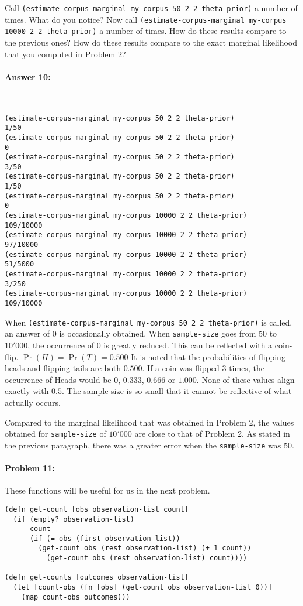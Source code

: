 \documentclass[12pt, letterpaper]{article}
\begin{document}
\noindent Call \texttt{(estimate-corpus-marginal my-corpus 50 2 2
  theta-prior)} a number of times. What do you notice? Now call
\texttt{(estimate-corpus-marginal my-corpus 10000 2 2 theta-prior)} a
number of times. How do these results compare to the previous ones?
How do these results compare to the exact marginal
likelihood that you computed in Problem 2?

\paragraph{Answer 10:}~\begin{lstlisting}
(estimate-corpus-marginal my-corpus 50 2 2 theta-prior)
1/50
(estimate-corpus-marginal my-corpus 50 2 2 theta-prior)
0
(estimate-corpus-marginal my-corpus 50 2 2 theta-prior)
3/50
(estimate-corpus-marginal my-corpus 50 2 2 theta-prior)
1/50
(estimate-corpus-marginal my-corpus 50 2 2 theta-prior)
0
(estimate-corpus-marginal my-corpus 10000 2 2 theta-prior)
109/10000
(estimate-corpus-marginal my-corpus 10000 2 2 theta-prior)
97/10000
(estimate-corpus-marginal my-corpus 10000 2 2 theta-prior)
51/5000
(estimate-corpus-marginal my-corpus 10000 2 2 theta-prior)
3/250
(estimate-corpus-marginal my-corpus 10000 2 2 theta-prior)
109/10000
\end{lstlisting} When \texttt{(estimate-corpus-marginal my-corpus 50 2 2 theta-prior)} is called, an answer of 0 is occasionally obtained. When \texttt{sample-size} goes from $50$ to $10'000$, the occurrence of $0$ is greatly reduced. This can be reflected with a coin-flip. $\Pr(H) = \Pr(T) = 0.500$ It is noted that the probabilities of flipping heads and flipping tails are both $0.500$. If a coin was flipped 3 times, the occurrence of Heads would be $0$, $0.333$, $0.666$ or $1.000$. None of these values align exactly with $0.5$. The sample size is so small that it cannot be reflective of what actually occurs.

Compared to the marginal likelihood that was obtained in Problem 2, the values obtained for \texttt{sample-size} of $10'000$ are close to that of Problem 2. As stated in the previous paragraph, there was a greater error when the \texttt{sample-size} was $50$.

\hrulefill
\paragraph{Problem 11:}
These functions will be useful for us in the next problem.

\begin{lstlisting}
(defn get-count [obs observation-list count]
  (if (empty? observation-list)
      count
      (if (= obs (first observation-list))
        (get-count obs (rest observation-list) (+ 1 count))
          (get-count obs (rest observation-list) count))))
          
(defn get-counts [outcomes observation-list]
  (let [count-obs (fn [obs] (get-count obs observation-list 0))]
    (map count-obs outcomes)))
\end{lstlisting}
\end{document}
